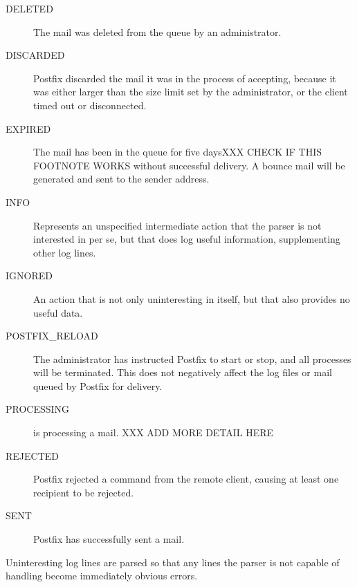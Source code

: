 \begin{eqlist}
\begin{description}
            \item [DELETED] The mail was deleted from the queue by an
                administrator.

            \item [DISCARDED] Postfix discarded the mail it was in the
                process of accepting, because it was either larger than the
                size limit set by the administrator, or the client timed
                out or disconnected.

            \item [EXPIRED] The mail has been in the queue for five
                days\footnotemark[\value{footnote}] XXX CHECK IF THIS
                FOOTNOTE WORKS without successful delivery.  A bounce mail
                will be generated and sent to the sender address.

            \item [INFO] Represents an unspecified intermediate action that
                the parser is not interested in per se, but that does log
                useful information, supplementing other log lines.

            \item [IGNORED] An action that is not only uninteresting in
                itself, but that also provides no useful data.

            \item [POSTFIX\_RELOAD] The administrator has instructed
                Postfix to start or stop, and all  processes
                will be terminated.  This does not negatively affect the
                log files or mail queued by Postfix for delivery.

            \item [PROCESSING]  is processing a mail.
                XXX ADD MORE DETAIL HERE

            \item [REJECTED] Postfix rejected a command from the remote
                client, causing at least one recipient to be rejected.

            \item [SENT] Postfix has successfully sent a mail.

        \end{description}

        Uninteresting log lines are parsed so that any lines the parser
        is not capable of handling become immediately obvious errors.


\end{eqlist}
